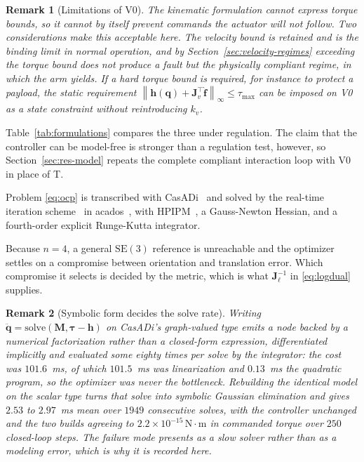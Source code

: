 \documentclass{ieeeaccess}
\newtheorem{remark}{Remark}
\newcommand{\norm}[1]{\left\| #1 \right\|}
\newcommand{\Jv}{\bm{J}_{\!v}}
\newcommand{\SEthree}{\mathrm{SE}(3)}
\begin{document}
\begin{remark}[Limitations of V0]
The kinematic formulation cannot express torque bounds, so it cannot by itself
prevent commands the actuator will not follow. Two considerations make this
acceptable here. The velocity bound is retained and is the binding limit in normal
operation, and by Section~\ref{sec:velocity-regimes} exceeding the torque bound
does not produce a fault but the physically compliant regime, in which the arm
yields. If a hard torque bound is required, for instance to protect a payload, the
static requirement $\norm{\bm h(\bm q)+\Jv^{\!\top}\hat{\bm f}}_\infty\le\tau_{\max}$
can be imposed on V0 as a state constraint without reintroducing $k_v$.
\end{remark}

Table~\ref{tab:formulations} compares the three under regulation. The claim that
the controller can be model-free is stronger than a regulation test, however, so
Section~\ref{sec:res-model} repeats the complete compliant interaction loop with
V0 in place of T.

Problem \eqref{eq:ocp} is transcribed with CasADi~\cite{andersson2019casadi} and
solved by the real-time iteration scheme~\cite{diehl2005rti} in
acados~\cite{verschueren2022acados}, with HPIPM~\cite{frison2020hpipm}, a
Gauss-Newton Hessian, and a fourth-order explicit Runge-Kutta integrator.

Because $n=4$, a general $\SEthree$ reference is unreachable and the optimizer
settles on a compromise between orientation and translation error. Which
compromise it selects is decided by the metric, which is what
$\bm J_\ell^{-1}$ in \eqref{eq:logdual} supplies.

\begin{remark}[Symbolic form decides the solve rate]
Writing $\ddot{\bm q}=\mathrm{solve}(\bm M,\bm\tau-\bm h)$ on CasADi's
graph-valued type emits a node backed by a numerical factorization rather than a
closed-form expression, differentiated implicitly and evaluated some eighty times
per solve by the integrator: the cost was $101.6$~ms, of which $101.5$~ms was
linearization and $0.13$~ms the quadratic program, so the optimizer was never the
bottleneck. Rebuilding the identical model on the scalar type turns that solve
into symbolic Gaussian elimination and gives $2.53$ to $2.97$~ms mean over $1949$
consecutive solves, with the controller unchanged and the two builds agreeing to
$2.2\times10^{-15}\,\mathrm{N}\cdot\mathrm{m}$ in commanded torque over $250$
closed-loop steps. The failure mode presents as a slow solver rather than as a
modeling error, which is why it is recorded here.
\label{rem:symbolic}
\end{remark}
\end{document}
